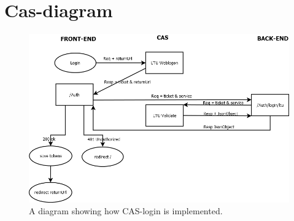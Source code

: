 \chapter{Cas-diagram}
\begin{figure}[H]
\centering
\includegraphics[scale=0.45]{img/login.png}
\caption{A diagram showing how CAS-login is implemented.}
\end{figure}
